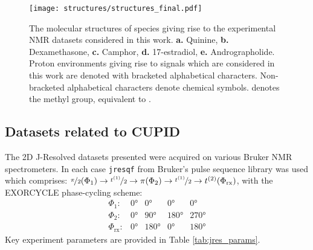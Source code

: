 \begin{figure}[h!]
    \centering
    \texttt{[image: structures/structures\_final.pdf]}
    \caption[
        The molecular structures of species giving rise to the experimental
        \acs{NMR} datasets considered in this work.
    ]{
        The molecular structures of species giving rise to the experimental
        \acs{NMR} datasets considered in this work.
        \textbf{a.} Quinine,
        \textbf{b.} Dexamethasone,
        \textbf{c.} Camphor,
        \textbf{d.} 17\textbeta-estradiol,
        \textbf{e.} Andrographolide.
        Proton environments giving rise to signals which are considered in this
        work are denoted with bracketed alphabetical characters. Non-bracketed
        alphabetical characters denote chemical symbols.  denotes the methyl
        group, equivalent to .
    }
    \label{fig:structures}
\end{figure}

\subsection{Datasets related to \ac{CUPID}}

The 2D J-Resolved datasets presented were acquired on various Bruker NMR
spectrometers. In each case \texttt{jresqf} from Bruker's pulse sequence
library was used which comprises:
 $\nicefrac{\pi}{2}(\Phi_1) \rightarrow \nicefrac{t^{(1)}}{2} \rightarrow
\pi(\Phi_{2}) \rightarrow \nicefrac{t^{(1)}}{2} \rightarrow t^{(2)}(\Phi_{\text{rx}})$, with
the EXORCYCLE phase-cycling scheme\cite[Section 11.6]{Keeler2010}:
\begin{equation*}
    \begin{array}{lllll}
        \Phi_{1}: & \ang{0} & \ang{0} & \ang{0} & \ang{0} \\
        \Phi_{2}: & \ang{0} & \ang{90} & \ang{180} & \ang{270} \\
        \Phi_{\text{rx}}: & \ang{0} & \ang{180} & \ang{0} & \ang{180}
    \end{array}
\end{equation*}
Key experiment parameters are provided in Table \ref{tab:jres_params}.

